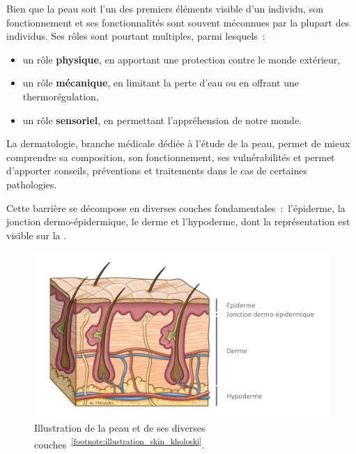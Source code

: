 Bien que la peau soit l'un des premiers éléments visible d'un individu, son fonctionnement et ses fonctionnalités sont souvent méconnues par la plupart des individus. Ses rôles sont pourtant multiples, parmi lesquels~:
\begin{itemize}
    \item un rôle \textbf{physique}, en apportant une protection contre le monde extérieur,
    \item un rôle \textbf{mécanique}, en limitant la perte d’eau ou en offrant une thermorégulation,
    \item un rôle \textbf{sensoriel}, en permettant l'appréhension de notre monde.
\end{itemize}\par

La dermatologie, branche médicale dédiée à l’étude de la peau, permet de mieux comprendre sa composition, son fonctionnement, ses vulnérabilités et permet d’apporter conseils, préventions et traitements dans le cas de certaines pathologies.\par

Cette barrière se décompose en diverses couches fondamentales~:~l’épiderme, la jonction dermo-épidermique, le derme et l’hypoderme, dont la représentation est visible sur la .\par
\begin{figure}[H]
    \centering
    \includegraphics[width=0.6\linewidth]{contents/chapter_1/resources/illustration_skin_kholoski.pdf}
    \caption{Illustration de la peau et de ses diverses couches~\textsuperscript{\ref{footnote:illustration_skin_kholoski}}.}
    \label{fig:illustration_skin_kholoski}
\end{figure}\par 

\addtocounter{footnote}{1}

